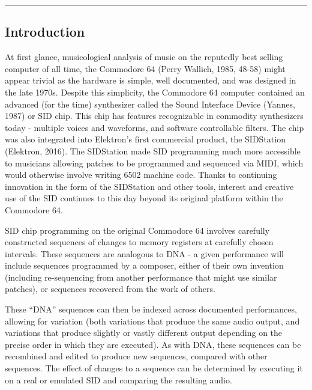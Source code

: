 \documentclass[10pt]{article}
\begin{document}
        \begin{center}
                \rule{150mm}{0.2mm}
        \end{center}

        \vspace{5mm}

\begin{multicols*}{2}

  \section{Introduction}

At first glance, musicological analysis of music on the reputedly best selling computer of all time, the Commodore 64 (Perry Wallich, 1985, 48-58) might appear trivial as the hardware is simple, well documented, and was designed in the late 1970s. Despite this simplicity, the Commodore 64 computer contained an advanced (for the time) synthesizer called the Sound Interface Device (Yannes, 1987) or SID chip. This chip has features recognizable in commodity synthesizers today - multiple voices and waveforms, and software controllable filters. The chip was also integrated into Elektron’s first commercial product, the SIDStation (Elektron, 2016). The SIDStation made SID programming much more accessible to musicians allowing patches to be programmed and sequenced via MIDI, which would otherwise involve writing 6502 machine code. Thanks to continuing innovation in the form of the SIDStation and other tools, interest and creative use of the SID continues to this day beyond its original platform within the Commodore 64.

SID chip programming on the original Commodore 64 involves carefully constructed sequences of changes to memory registers at carefully chosen intervals. These sequences are analogous to DNA - a given performance will include sequences programmed by a composer, either of their own invention (including re-sequencing from another performance that might use similar patches), or sequences recovered from the work of others.

These “DNA” sequences can then be indexed across documented performances, allowing for variation (both variations that produce the same audio output, and variations that produce slightly or vastly different output depending on the precise order in which they are executed). As with DNA, these sequences can be recombined and edited to produce new sequences, compared with other sequences. The effect of changes to a sequence can be determined by executing it on a real or emulated SID and comparing the resulting audio.


\end{multicols*}
\end{document}
